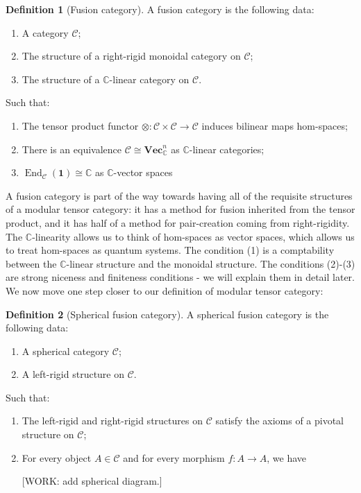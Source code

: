 \documentclass{article}
\theoremstyle{definition}
\newtheorem*{definition}{Definition}
\DeclareMathOperator{\End}{End}
\newcommand{\CC}{\mathbb{C}}
\newcommand{\C}{\mathscr{C}}
\newcommand{\0}{\left|0\right>}
\newcommand{\1}{\left|1\right>}
\newcommand{\one}{\mathbf{1}}
\renewcommand{\Vec}{\mathbf{Vec}}
\numberwithin{figure}{section}
\begin{document}
\begin{definition}[Fusion category] A fusion category is the following data:

\begin{enumerate}
\item A category $\C$;
\item The structure of a right-rigid monoidal category on $\C$;
\item The structure of a $\CC$-linear category on $\C$.
\end{enumerate}

Such that:

\begin{enumerate}
\item The tensor product functor $\otimes: \C\times \C\to \C$ induces bilinear maps hom-spaces;
\item There is an equivalence $\C \cong \Vec_\CC^n$ as $\CC$-linear categories;
\item $\End_\C(\one)\cong \CC$ as $\CC$-vector spaces
\end{enumerate}

\raggedleft\qedsymbol{}
\end{definition}

A fusion category is part of the way towards having all of the requisite structures of a modular tensor category: it has a method for fusion inherited from the tensor product, and it has half of a method for pair-creation coming from right-rigidity. The $\CC$-linearity allows us to think of hom-spaces as vector spaces, which allows us to treat hom-spaces as quantum systems. The condition (1) is a comptability between the $\CC$-linear structure and the monoidal structure. The conditions (2)-(3) are strong niceness and finiteness conditions - we will explain them in detail later. We now move one step closer to our definition of modular tensor category:

\begin{definition}[Spherical fusion category] A spherical fusion category is the following data:

\begin{enumerate}
\item A spherical category $\C$;
\item A left-rigid structure on $\C$.
\end{enumerate}

Such that:

\begin{enumerate}
\item The left-rigid and right-rigid structures on $\C$ satisfy the axioms of a pivotal structure on $\C$;
\item For every object $A\in \C$ and for every morphism $f: A \to A$, we have

[WORK: add spherical diagram.]
\end{enumerate}

\raggedleft\qedsymbol{}
\end{definition}
\end{document}
